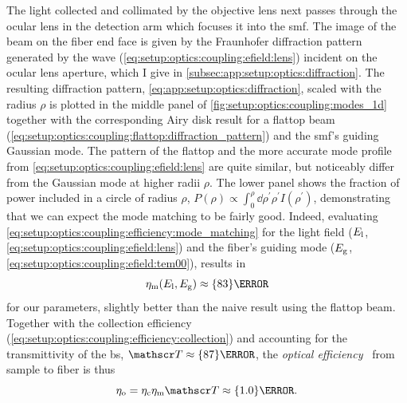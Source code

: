 The light collected and collimated by the objective lens next passes through the ocular lens in the detection arm which focuses it into the \gls{smf}.
The image of the beam on the fiber end face is given by the Fraunhofer diffraction pattern generated by the wave (\cref{eq:setup:optics:coupling:efield:lens}) incident on the ocular lens aperture, which I give in \cref{subsec:app:setup:optics:diffraction}.
The resulting diffraction pattern, \cref{eq:app:setup:optics:diffraction}, scaled with the radius $\rho$ is plotted in the middle panel of \cref{fig:setup:optics:coupling:modes_1d} together with the corresponding Airy disk result for a flattop beam (\cref{eq:setup:optics:coupling:flattop:diffraction_pattern}) and the \gls{smf}'s guiding Gaussian mode.
The pattern of the flattop and the more accurate mode profile from \cref{eq:setup:optics:coupling:efield:lens} are quite similar, but noticeably differ from the Gaussian mode at higher radii $\rho$.
The lower panel shows the fraction of power included in a circle of radius $\rho$, $P(\rho)\propto \int_0^{\rho}\dd{\rho^{\prime}} \rho^{\prime} I(\rho^{\prime})$, demonstrating that we can expect the mode matching to be fairly good.
Indeed, evaluating \cref{eq:setup:optics:coupling:efficiency:mode_matching} for the light field ($E_{\mathrm{l}}$, \cref{eq:setup:optics:coupling:efield:lens}) and the fiber's guiding mode ($E_{\mathrm{g}}$, \cref{eq:setup:optics:coupling:efield:tem00}), results in
\begin{equation}\label{eq:setup:optics:coupling:efficiency:mode_matching:eval}
    \eta_{\mr{m}}(E_{\mr{l}}, E_{\mr{g}})\approx\qty{83}{\percent}
\end{equation}
for our parameters, slightly better than the naive result using the flattop beam.
Together with the collection efficiency (\cref{eq:setup:optics:coupling:efficiency:collection}) and accounting for the transmittivity of the \gls{bs}, $\transmittance\approx\qty{87}{\percent}$,
the \emph{optical efficiency}~\cite{Sze2007} from sample to fiber is thus
\begin{equation}\label{eq:setup:optics:coupling:efficiency:optical}
    \eta_{\mr{o}} = \eta_{\mr{c}}\eta_{\mr{m}} \transmittance \approx\qty{1.0}{\percent}.
\end{equation}

